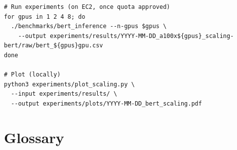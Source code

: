 \documentclass[11pt,letterpaper]{article}
\begin{document}
\begin{lstlisting}[style=bash, caption=Generating speedup plots]
# Run experiments (on EC2, once quota approved)
for gpus in 1 2 4 8; do
  ./benchmarks/bert_inference --n-gpus $gpus \
    --output experiments/results/YYYY-MM-DD_a100x${gpus}_scaling-bert/raw/bert_${gpus}gpu.csv
done

# Plot (locally)
python3 experiments/plot_scaling.py \
  --input experiments/results/ \
  --output experiments/plots/YYYY-MM-DD_bert_scaling.pdf
\end{lstlisting}

\section{Glossary}
\end{document}
